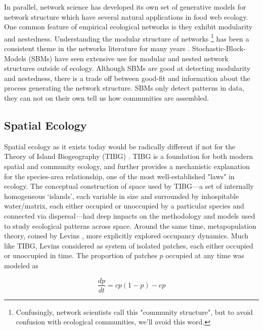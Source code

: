 \documentclass[]{article}
\begin{document}
In parallel, network science has developed
its own set of generative models for network structure which have
several natural applications in food web ecology.
One common feature of empirical ecological networks is they exhibit modularity and nestedness. Understanding the modular structure of networks \footnote{Confusingly, network scientists call this "community structure", but to avoid confusion with ecological communities, we'll avoid this word.} has been a consistent theme in the networks literature for many years \citep{newman, clauset}.
Stochastic-Block-Models (SBMs) have seen extensive use for modular and
nested network structures outside of ecology. Although SBMs are good at detecting modularity and nestedness, there is a trade off between good-fit and information about the process generating the network structure. SBMs only detect patterns in data, they can not on their own tell us how communities are assembled.


\hypertarget{spatial-ecology}{%
\subsection{Spatial Ecology}\label{spatial-ecology}}

Spatial ecology as it exists today would be radically different if not
for the Theory of Island Biogeography (TIBG)
\citep{macarthur_theory_2016}. TIBG is a foundation for both
modern spatial and community ecology, and further provides a mechanistic
explanation for the species-area relationship, one of the most
well-established "laws" in ecology. The conceptual construction of
space used by TIBG---a set of internally homogeneous `islands', each
variable in size and surrounded by inhospitable water/matrix, each
either occupied or unoccupied by a particular species and connected via
dispersal---had deep impacts on the methodology and models used to study
ecological patterns across space. Around the same time, metapopulation
theory, coined by Levins \citep{levins_demographic_1969}, more
explicitly explored occupancy dynamics. Much like TIBG, Levins
considered as system of isolated patches, each either occupied or
unoccupied in time. The proportion of patches \(p\) occupied at any time
was modeled as

\[\frac{dp}{dt} = cp(1-p) - ep\]
\end{document}
